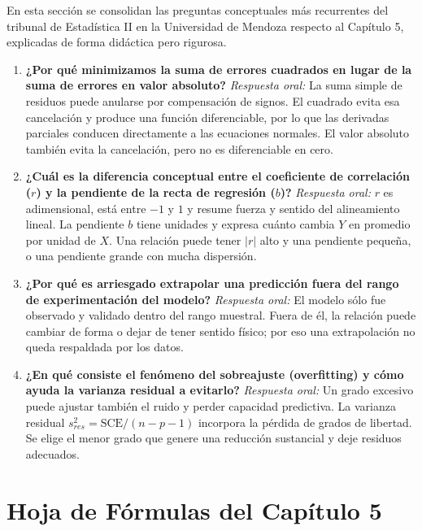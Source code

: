 \documentclass[11pt,a4paper]{article}
\begin{document}
En esta sección se consolidan las preguntas conceptuales más recurrentes del tribunal de Estadística II en la Universidad de Mendoza respecto al Capítulo 5, explicadas de forma didáctica pero rigurosa.

\begin{enumerate}
    \item \textbf{¿Por qué minimizamos la suma de errores cuadrados en lugar de la suma de errores en valor absoluto?}
    \textit{Respuesta oral:} La suma simple de residuos puede anularse por compensación de signos. El cuadrado evita esa cancelación y produce una función diferenciable, por lo que las derivadas parciales conducen directamente a las ecuaciones normales. El valor absoluto también evita la cancelación, pero no es diferenciable en cero.
    
    \item \textbf{¿Cuál es la diferencia conceptual entre el coeficiente de correlación ($r$) y la pendiente de la recta de regresión ($b$)?}
    \textit{Respuesta oral:} $r$ es adimensional, está entre $-1$ y $1$ y resume fuerza y sentido del alineamiento lineal. La pendiente $b$ tiene unidades y expresa cuánto cambia $Y$ en promedio por unidad de $X$. Una relación puede tener $|r|$ alto y una pendiente pequeña, o una pendiente grande con mucha dispersión.
    
    \item \textbf{¿Por qué es arriesgado extrapolar una predicción fuera del rango de experimentación del modelo?}
    \textit{Respuesta oral:} El modelo sólo fue observado y validado dentro del rango muestral. Fuera de él, la relación puede cambiar de forma o dejar de tener sentido físico; por eso una extrapolación no queda respaldada por los datos.
    
    \item \textbf{¿En qué consiste el fenómeno del sobreajuste (overfitting) y cómo ayuda la varianza residual a evitarlo?}
    \textit{Respuesta oral:} Un grado excesivo puede ajustar también el ruido y perder capacidad predictiva. La varianza residual $s^2_{res}=\mathrm{SCE}/(n-p-1)$ incorpora la pérdida de grados de libertad. Se elige el menor grado que genere una reducción sustancial y deje residuos adecuados.
\end{enumerate}

\clearpage
\section{Hoja de Fórmulas del Capítulo 5}
\end{document}
